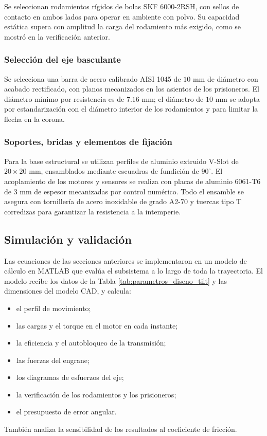 \documentclass[../../General.tex]{subfiles}
\begin{document}
Se seleccionan rodamientos rígidos de bolas SKF 6000-2RSH, con sellos de contacto en ambos lados para operar en ambiente con polvo. Su capacidad estática supera con amplitud la carga del rodamiento más exigido, como se mostró en la verificación anterior.

\subsubsection{Selección del eje basculante}

Se selecciona una barra de acero calibrado AISI 1045 de $10\text{ mm}$ de diámetro con acabado rectificado, con planos mecanizados en los asientos de los prisioneros. El diámetro mínimo por resistencia es de $7.16\text{ mm}$; el diámetro de $10\text{ mm}$ se adopta por estandarización con el diámetro interior de los rodamientos y para limitar la flecha en la corona.

\subsubsection{Soportes, bridas y elementos de fijación}

Para la base estructural se utilizan perfiles de aluminio extruido V-Slot de $20\times20\text{ mm}$, ensamblados mediante escuadras de fundición de $90^\circ$. El acoplamiento de los motores y sensores se realiza con placas de aluminio 6061-T6 de $3\text{ mm}$ de espesor mecanizadas por control numérico. Todo el ensamble se asegura con tornillería de acero inoxidable de grado A2-70 y tuercas tipo T corredizas para garantizar la resistencia a la intemperie.


\subsection{Simulación y validación}

Las ecuaciones de las secciones anteriores se implementaron en un modelo de cálculo en MATLAB que evalúa el subsistema a lo largo de toda la trayectoria. El modelo recibe los datos de la Tabla \ref{tab:parametros_diseno_tilt} y las dimensiones del modelo CAD, y calcula:
\begin{itemize}
    \item el perfil de movimiento;
    \item las cargas y el torque en el motor en cada instante;
    \item la eficiencia y el autobloqueo de la transmisión;
    \item las fuerzas del engrane;
    \item los diagramas de esfuerzos del eje;
    \item la verificación de los rodamientos y los prisioneros;
    \item el presupuesto de error angular.
\end{itemize}
También analiza la sensibilidad de los resultados al coeficiente de fricción.
\end{document}
